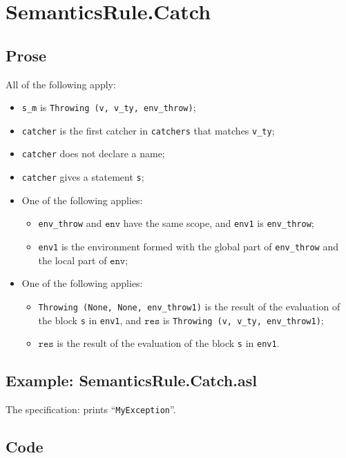 \documentclass{book}
\newcommand\env[0]{\texttt{env}}
\newcommand\vres[0]{\texttt{res}}
\begin{document}
\section{SemanticsRule.Catch \label{sec:SemanticsRule.Catch}}

    \subsection{Prose}
    All of the following apply:
    \begin{itemize}
    \item \texttt{s\_m} is \texttt{Throwing (v, v\_ty, env\_throw)};
    \item \texttt{catcher} is the first catcher in \texttt{catchers} that matches \texttt{v\_ty};
    \item \texttt{catcher} does not declare a name;
    \item \texttt{catcher} gives a statement \texttt{s};
    \item One of the following applies:
      \begin{itemize}
      \item \texttt{env\_throw} and $\env$ have the same scope, and \texttt{env1} is \texttt{env\_throw};
      \item \texttt{env1} is the environment formed with the global part of \texttt{env\_throw}
        and the local part of $\env$;
      \end{itemize}
    \item One of the following applies:
      \begin{itemize}
      \item \texttt{Throwing (None, None, env\_throw1)} is the result of the evaluation of
        the block \texttt{s} in \texttt{env1}, and $\vres$ is \texttt{Throwing (v, v\_ty, env\_throw1)};
      \item $\vres$ is the result of the evaluation of the block \texttt{s} in \texttt{env1}.
      \end{itemize}
    \end{itemize}

    \subsection{Example: SemanticsRule.Catch.asl}
    The specification:
    prints ``\texttt{MyException}''.

  \subsection{Code}
\end{document}
